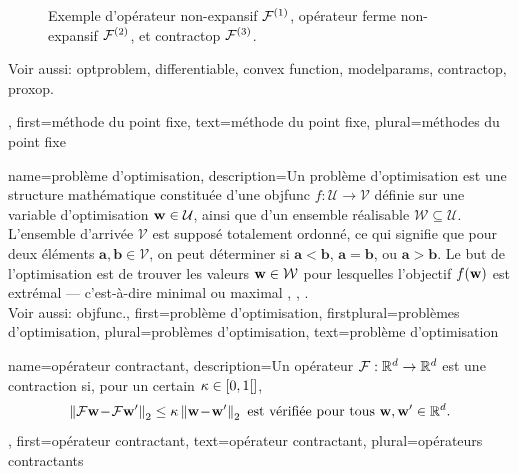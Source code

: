{{\begin{figure}[H]
\begin{center}
			\end{center} 
			\caption{Exemple d'opérateur non-expansif $\mathcal{F}^{(1)}$, opérateur ferme non-expansif $\mathcal{F}^{(2)}$, et \gls{contractop} $\mathcal{F}^{(3)}$. \label{fig_examples_nonexp_dict}}
		\end{figure}
		Voir aussi: \gls{optproblem}, \gls{differentiable}, \gls{convex} \gls{function}, \glspl{modelparam}, 
		\gls{contractop}, \gls{proxop}.},
	first={méthode du point fixe},
	text={méthode du point fixe},
	plural={méthodes du point fixe}
}

{name={problème d’optimisation}, 
	description={Un problème d’optimisation est une structure mathématique 
		constituée d’une \gls{objfunc} $f: \mathcal{U} \rightarrow \mathcal{V}$ 
		définie sur une variable d’optimisation ${\bf w} \in \mathcal{U}$, ainsi que d’un 
		ensemble réalisable $\mathcal{W} \subseteq \mathcal{U}$. L'ensemble d'arrivée $\mathcal{V}$ est 
		supposé totalement ordonné, ce qui signifie que pour deux éléments $\mathbf{a}, \mathbf{b} \in \mathcal{V}$, 
		on peut déterminer si $\mathbf{a} < \mathbf{b}$, $\mathbf{a} = \mathbf{b}$, 
		ou $\mathbf{a} > \mathbf{b}$. Le but de l’optimisation est de trouver les valeurs ${\bf w} \in \mathcal{W}$ 
		pour lesquelles l’objectif $f({\bf w})$ est extrémal — c’est-à-dire minimal ou maximal \cite{BoydConvexBook}, \cite{BertsekasNonLinProgr}, \cite{nesterov04}.
		\\
		Voir aussi: \gls{objfunc}.},
	first={problème d’optimisation},
	firstplural={problèmes d’optimisation}, 
	plural={problèmes d’optimisation}, 
	text={problème d’optimisation}
}

{name={opérateur contractant},
	description={Un opérateur $\mathcal{F}: \mathbb{R}^{d} \rightarrow \mathbb{R}^{d}$
		est une contraction si, pour un certain $\kappa \in [0,1[]$,
		\begin{equation} 
			\nonumber
			\left\Vert { \mathcal{F}{\bf w}\!-\!\mathcal{F}{\bf w}'} \right\Vert_{2}  \leq  \kappa	\left\Vert {{\bf w}\!-\!{\bf w}'} \right\Vert_{2} \mbox{ est vérifiée pour tous } {\bf w},{\bf w}' \in \mathbb{R}^{d}.
		\end{equation}
	},
	first={opérateur contractant},
	text={opérateur contractant}, 
	plural={opérateurs contractants}
}

